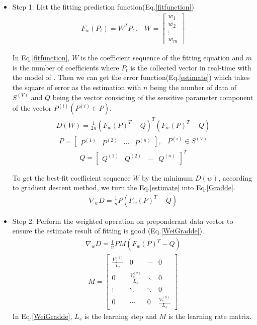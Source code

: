\begin{itemize}
	\item Step 1: List the fitting prediction function(Eq.\ref{fitfunction})
	\begin{eqnarray}\label{fitfunction}
	F_{w}(P_{t})=W^{T}P_{t}\,,&W=\begin{bmatrix}w_{1}\\ w_{2}\\ \vdots \\ w_{m}\end{bmatrix}
	\end{eqnarray}
	
	In Eq.\ref{fitfunction}, $W$ is the coefficient sequence of the fitting equation and $m$ is the number of coefficients where $P_{t}$ is the collected vector in real-time with the model of  . Then we can get the error function(Eq.\ref{estimate}) which takes the square of error as the estimation with $n$ being the number of data of $S^{(V)}$ and $Q$ being the vector consisting of the sensitive parameter component of the vector $P^{(i)}( P^{(i)} \in P)$.
	\begin{eqnarray}\label{estimate}
		D(W)=\frac{1}{2n}(F_{w}(P)^{T}-Q)^{T}(F_{w}(P)^{T}-Q)
	\end{eqnarray}
	\begin{eqnarray}
		P=\begin{bmatrix}P^{(1)}&P^{(2)}  &\cdots  &P^{(n)} \end{bmatrix}, &P^{(i)}\in S^{(V)}
	\end{eqnarray}
	\begin{eqnarray}
		Q=\begin{bmatrix}Q^{(1)}& Q^{(2)}& \cdots & Q^{(n)}\end{bmatrix}^{T}
	\end{eqnarray}
	
	To get the best-fit coefficient sequence $W$ by the minimum $D(w)$, according to gradient descent method, we turn the Eq.\ref{estimate} into Eq.\ref{Gradde}.
	\begin{eqnarray}\label{Gradde}
	\nabla_{w}D=\frac{1}{n}P(F_{w}(P)^{T}-Q)
	\end{eqnarray}
	
	\item Step 2: Perform the weighted operation on preponderant data vector to ensure the estimate result of fitting is good (Eq.\ref{WeiGradde}).
	\begin{eqnarray}
	\nabla_{w}D=\frac{1}{n}PM(F_{w}(P)^{T}-Q)
	\end{eqnarray}
	\begin{eqnarray}\label{WeiGradde}
	M=\begin{bmatrix}
	\frac{V_{z}^{(1)}}{L_{s}}&0&\cdots&0\\
	0&\frac{V_{z}^{(2)}}{L_{s}}&\ddots&0\\
	\vdots&\ddots&\ddots&0\\
	0&\cdots&0&\frac{V_{z}^{(n)}}{L_{s}}
	\end{bmatrix}
	\end{eqnarray}
	In Eq.\ref{WeiGradde}, $L_s$ is the learning step and $M$ is the learning rate matrix.
	

\end{itemize}
